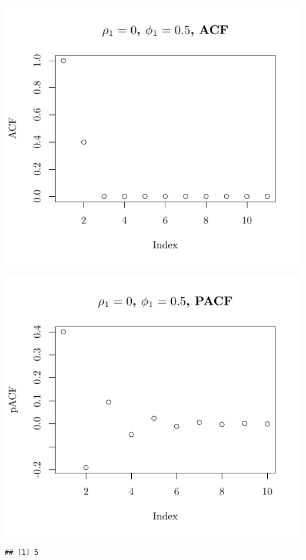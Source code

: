 \documentclass[10pt]{paper}\usepackage[]{graphicx}\usepackage[]{color}
\makeatletter
\def\maxwidth{ %
  \ifdim\Gin@nat@width>\linewidth
    \linewidth
  \else
    \Gin@nat@width
  \fi
}
\newenvironment{kframe}{%
 \def\at@end@of@kframe{}%
 \ifinner\ifhmode%
  \def\at@end@of@kframe{\end{minipage}}%
  \begin{minipage}{\columnwidth}%
 \fi\fi%
 \def\FrameCommand##1{\hskip\@totalleftmargin \hskip-\fboxsep
 \colorbox{shadecolor}{##1}\hskip-\fboxsep
     \hskip-\linewidth \hskip-\@totalleftmargin \hskip\columnwidth}%
 \MakeFramed {\advance\hsize-\width
   \@totalleftmargin\z@ \linewidth\hsize
   \@setminipage}}%
 {\par\unskip\endMakeFramed%
 \at@end@of@kframe}
\newenvironment{knitrout}{}{} %
\makeatother
\begin{document}
\begin{knitrout}
{\centering \includegraphics[width=\maxwidth]{figure/graphics-plotter-23} 

}




{\centering \includegraphics[width=\maxwidth]{figure/graphics-plotter-24} 

}


\begin{kframe}\begin{verbatim}
## [1] 5
\end{verbatim}
\end{kframe}


\end{knitrout}
\end{document}
